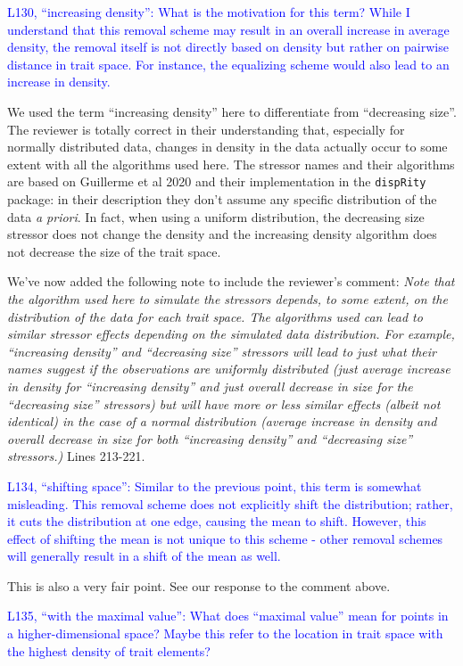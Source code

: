 \documentclass[
]{article}
\begin{document}
\textcolor{blue}{L130, ``increasing density'': What is the motivation for this term? While I understand that this removal scheme may result in an overall increase in average density, the removal itself is not directly based on density but rather on pairwise distance in trait space.
For instance, the equalizing scheme would also lead to an increase in density.}

We used the term ``increasing density'' here to differentiate from ``decreasing size''.
The reviewer is totally correct in their understanding that, especially for normally distributed data, changes in density in the data actually occur to some extent with all the algorithms used here.
The stressor names and their algorithms are based on Guillerme et al 2020 and their implementation in the \texttt{dispRity} package: in their description they don't assume any specific distribution of the data \textit{a priori}.
In fact, when using a uniform distribution, the decreasing size stressor does not change the density and the increasing density algorithm does not decrease the size of the trait space.

We've now added the following note to include the reviewer's comment:
\textit{Note that the algorithm used here to simulate the stressors depends, to some extent, on the distribution of the data for each trait space.
The algorithms used can lead to similar stressor effects depending on the simulated data distribution.
For example, ``increasing density'' and ``decreasing size'' stressors will lead to just what their names suggest if the observations are uniformly distributed (just average increase in density for ``increasing density'' and just overall decrease in size for the ``decreasing size'' stressors) but will have more or less similar effects (albeit not identical) in the case of a normal distribution (average increase in density and overall decrease in size for both ``increasing density'' and ``decreasing size'' stressors.)}
Lines 213-221.

\textcolor{blue}{L134, ``shifting space'': Similar to the previous point, this term is somewhat misleading.
This removal scheme does not explicitly shift the distribution; rather, it cuts the distribution at one edge, causing the mean to shift.
However, this effect of shifting the mean is not unique to this scheme - other removal schemes will generally result in a shift of the mean as well.}

This is also a very fair point.
See our response to the comment above.

\textcolor{blue}{L135, ``with the maximal value'': What does ``maximal value'' mean for points in a higher-dimensional space? Maybe this refer to the location in trait space with the highest density of trait elements?}
\end{document}
